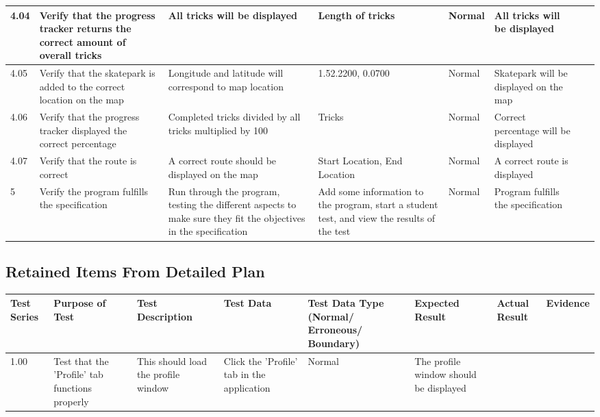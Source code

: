\begin{landscape}
\begin{center}
\begin{longtable}{|p{1.5cm}|p{2.5cm}|p{2.5cm}|p{2cm}|p{2cm}|p{2cm}|p{2cm}|p{2cm}|}
4.04 & Verify that the progress tracker returns the correct amount of overall tricks & All tricks will be displayed & Length of tricks & Normal & All tricks will be displayed & & \\ \hline

4.05 & Verify that the skatepark is added to the correct location on the map & Longitude and latitude will correspond to map location & 1.52.2200, 0.0700 & Normal & Skatepark will be displayed on the map & & \\ \hline

4.06 & Verify that the progress tracker displayed the correct percentage & Completed tricks divided by all tricks multiplied by 100  & Tricks & Normal & Correct percentage will be displayed & & \\ \hline

4.07 & Verify that the route is correct & A correct route should be displayed on the map & Start Location, End Location & Normal & A correct route is displayed & & \\ \hline



5 & Verify the program fulfills the specification & Run through the program, testing the different aspects to make sure they fit the objectives in the specification & Add some information to the program, start a student test, and view the results of the test & Normal & Program fulfills the specification & & \\ \hline

    \end{longtable}
\end{center}

\subsection{Retained Items From Detailed Plan}

\begin{center}
    \begin{longtable}{|p{1.5cm}|p{2.5cm}|p{2.5cm}|p{2cm}|p{2cm}|p{2cm}|p{2cm}|p{2cm}|}
        \hline
        \textbf{Test Series} & \textbf{Purpose of Test} & \textbf{Test Description} & \textbf{Test Data} & \textbf{Test Data Type (Normal/ Erroneous/ Boundary)} & \textbf{Expected Result} & \textbf{Actual Result} & \textbf{Evidence}\\ \hline
1.00 & Test that the 'Profile' tab functions properly & This should load the profile window & Click the 'Profile' tab in the application & Normal & The profile window should be displayed & &  \\ \hline


\end{longtable}
\end{center}
\end{landscape}

